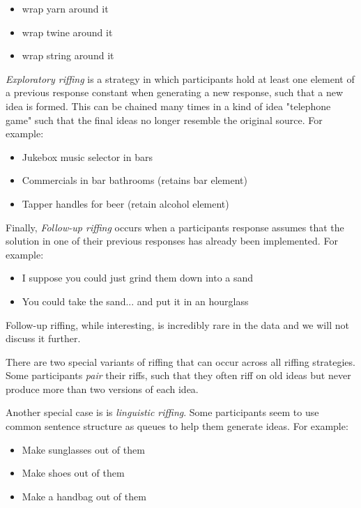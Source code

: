 \begin{itemize}
    \item wrap yarn around it
    \item wrap twine around it
    \item wrap string around it
\end{itemize}

\emph{Exploratory riffing} is a strategy in which participants hold at least one element of a previous response constant when generating a new response, such that a new idea is formed. This can be chained many times in a kind of idea "telephone game" such that the final ideas no longer resemble the original source. For example:

\begin{itemize}
    \item Jukebox music selector in bars
    \item Commercials in bar bathrooms (retains bar element)
    \item Tapper handles for beer (retain alcohol element)
\end{itemize}

Finally, \emph{Follow-up riffing} occurs when a participants response assumes that the solution in one of their previous responses has already been implemented. For example:

\begin{itemize}
    \item I suppose you could just grind them down into a sand
    \item You could take the sand... and put it in an hourglass
\end{itemize}

Follow-up riffing, while interesting, is incredibly rare in the data and we will not discuss it further.

There are two special variants of riffing that can occur across all riffing strategies. Some participants \emph{pair} their riffs, such that they often riff on old ideas but never produce more than two versions of each idea.

Another special case is is \emph{linguistic riffing}. Some participants seem to use common sentence structure as queues to help them generate ideas. For example:

\begin{itemize}
    \item Make sunglasses out of them
    \item Make shoes out of them
    \item Make a handbag out of them
\end{itemize}

